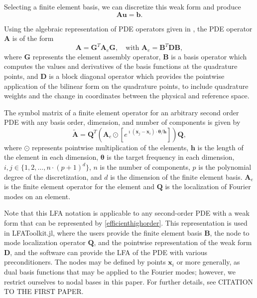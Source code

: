 \documentclass[review]{siamart190516}
\begin{document}
Selecting a finite element basis, we can discretize this weak form and produce
\begin{equation}\label{eq:pdediscrete}
\mathbf{A} \mathbf{u} = \mathbf{b}.
\end{equation}

Using the algebraic representation of PDE operators given in \cite{brown2010efficient}, the PDE operator $\mathbf{A}$ is of the form
\begin{equation}\label{efficienthighorder}
\mathbf{A} = \mathbf{G}^T \mathbf{A}_e \mathbf{G},\quad \text{with} \,\,\mathbf{A}_e = \mathbf{B}^T \mathbf{D} \mathbf{B},
\end{equation}
where $\mathbf{G}$ represents the element assembly operator, $\mathbf{B}$ is a basis operator which computes the values and derivatives of the basis functions at the quadrature points, and $\mathbf{D}$ is a block diagonal operator which provides the pointwise application of the bilinear form on the quadrature points, to include quadrature weights and the change in coordinates between the physical and reference space.

\begin{definition}\label{def:high_order_symbol}
The symbol matrix of a finite element operator for an arbitrary second order PDE with any basis order, dimension, and number of components is given by
\begin{equation}\label{symbolhighorder}
\tilde{\mathbf{A}} = \mathbf{Q}^T \left( \mathbf{A}_e \odot \left[ e^{\imath \left( \mathbf{x}_j - \mathbf{x}_i \right) \cdot \boldsymbol{\theta} / \mathbf{h}} \right] \right) \mathbf{Q},
\end{equation}
where $\odot$ represents pointwise multiplication of the elements, $\mathbf{h}$ is the length of the element in each dimension, $\boldsymbol{\theta}$ is the target frequency in each dimension, $i, j \in \lbrace 1, 2, \dots, n \cdot \left( p + 1 \right)^d \rbrace$, $n$ is the number of components, $p$ is the polynomial degree of the discretization, and $d$ is the dimension of the finite element basis.
$\mathbf{A}_e$ is the finite element operator for the element and $\mathbf{Q}$ is the localization of Fourier modes on an element.
\end{definition}

Note that this LFA notation is applicable to any second-order PDE with a weak form that can be represented by \cref{efficienthighorder}.
This representation is used in LFAToolkit.jl, where the users provide the finite element basis $\mathbf{B}$, the node to mode localization operator $\mathbf{Q}$, and the pointwise representation of the weak form $\mathbf{D}$, and the software can provide the LFA of the PDE with various preconditioners.
The nodes may be defined by points $\mathbf x_i$ or more generally, as dual basis functions that may be applied to the Fourier modes; however, we restrict ourselves to nodal bases in this paper.
For further details, see CITATION TO THE FIRST PAPER.
\end{document}
